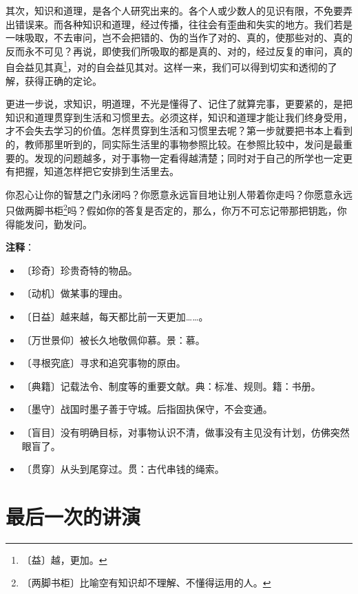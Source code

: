 \documentclass[12pt,UTF-8,openany]{ctexbook}
\begin{document}
\begin{normalsize}
    其次，知识和道理，是各个人研究出来的。各个人或少数人的见识有限，不免要弄出错误来。而各种知识和道理，经过传播，往往会有歪曲和失实的地方。我们若是一味吸取，不去审问，岂不会把错的、伪的当作了对的、真的，使那些对的、真的反而永不可见？再说，即使我们所吸取的都是真的、对的，经过反复的审问，真的自会益见其真\footnote{〔益〕越，更加。}，对的自会益见其对。这样一来，我们可以得到切实和透彻的了解，获得正确的定论。
    
    更进一步说，求知识，明道理，不光是懂得了、记住了就算完事，更要紧的，是把知识和道理贯穿到生活和习惯里去。必须这样，知识和道理才能让我们终身受用，才不会失去学习的价值。怎样贯穿到生活和习惯里去呢？第一步就要把书本上看到的，教师那里听到的，同实际生活里的事物参照比较。在参照比较中，发问是最重要的。发现的问题越多，对于事物一定看得越清楚；同时对于自己的所学也一定更有把握，知道怎样把它安排到生活里去。
    
    你忍心让你的智慧之门永闭吗？你愿意永远盲目地让别人带着你走吗？你愿意永远只做两脚书柜\footnote{〔两脚书柜〕比喻空有知识却不理解、不懂得运用的人。}吗？假如你的答复是否定的，那么，你万不可忘记带那把钥匙，你得能发问，勤发问。
    
\end{normalsize}


\newpage

\textbf{注释}：

\vspace{-1em}

\begin{itemize}
    \setlength\itemsep{-0.2em}
    \item 〔珍奇〕珍贵奇特的物品。
    \item 〔动机〕做某事的理由。
    \item 〔日益〕越来越，每天都比前一天更加……。
    \item 〔万世景仰〕被长久地敬佩仰慕。景：慕。
    \item 〔寻根究底〕寻求和追究事物的原由。
    \item 〔典籍〕记载法令、制度等的重要文献。典：标准、规则。籍：书册。
    \item 〔墨守〕战国时墨子善于守城。后指固执保守，不会变通。
    \item 〔盲目〕没有明确目标，对事物认识不清，做事没有主见没有计划，仿佛突然眼盲了。
    \item 〔贯穿〕从头到尾穿过。贯：古代串钱的绳索。
\end{itemize}

\chapter{最后一次的讲演}
\end{document}
